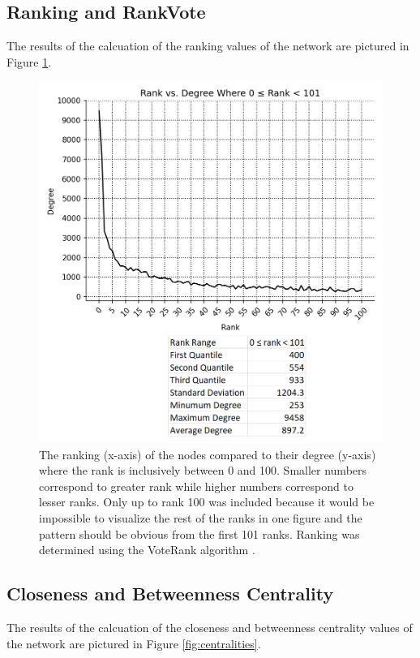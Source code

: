 \documentclass[9pt,twocolumn,twoside]{pnas-new}
\begin{document}
\subsection*{Ranking and RankVote} The results of the calcuation of the ranking values of the network are pictured in Figure \ref{fig:vote_ranks}.

\begin{figure}
\centering
\includegraphics[width=.8\linewidth]{vote_ranks}
\caption{The ranking (x-axis) of the nodes compared to their degree (y-axis) where the rank is inclusively between 0 and 100. Smaller numbers correspond to greater rank while higher numbers correspond to lesser ranks. Only up to rank 100 was included because it would be impossible to visualize the rest of the ranks in one figure and the pattern should be obvious from the first 101 ranks. Ranking was determined using the VoteRank algorithm \cite{networkxvoteranks}.
}
\label{fig:vote_ranks}
\end{figure}

\subsection*{Closeness and Betweenness Centrality} The results of the calcuation of the closeness and betweenness centrality values of the network are pictured in Figure \ref{fig:centralities}.
\end{document}
